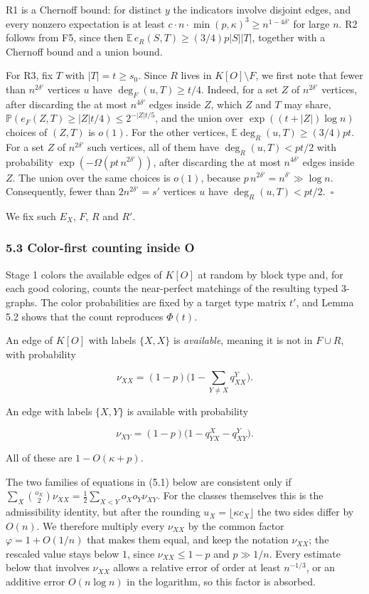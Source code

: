\documentclass[english,11pt,a4paper]{article}
\begin{document}
R1 is a Chernoff bound: for distinct \(y\) the indicators involve disjoint edges, and every nonzero expectation is at least \(c\cdot n\cdot\min(p,\kappa)^3\ge n^{1-4\delta'}\) for large \(n\). R2 follows from F5, since then \(\mathbb E\,e_R(S,T)\ge(3/4)p|S||T|\), together with a Chernoff bound and a union bound.

For R3, fix \(T\) with \(|T|=t\ge s_0\). Since \(R\) lives in \(K[O]\setminus F\), we first note that fewer than \(n^{2\delta'}\) vertices \(u\) have \(\deg_F(u,T)\ge t/4\). Indeed, for a set \(Z\) of \(n^{2\delta'}\) vertices, after discarding the at most \(n^{4\delta'}\) edges inside \(Z\), which \(Z\) and \(T\) may share, \(\mathbb P(e_F(Z,T)\ge|Z|t/4)\le2^{-|Z|t/5}\), and the union over \(\exp((t+|Z|)\log n)\) choices of \((Z,T)\) is \(o(1)\). For the other vertices, \(\mathbb E\deg_R(u,T)\ge(3/4)pt\). For a set \(Z\) of \(n^{2\delta'}\) such vertices, all of them have \(\deg_R(u,T)<pt/2\) with probability \(\exp(-\Omega(pt\,n^{2\delta'}))\), after discarding the at most \(n^{4\delta'}\) edges inside \(Z\). The union over the same choices is \(o(1)\), because \(p\,n^{2\delta'}=n^{\delta'}\gg\log n\). Consequently, fewer than \(2n^{2\delta'}=s'\) vertices \(u\) have \(\deg_R(u,T)<pt/2\).~\(\square\)

We fix such \(E_X\), \(F\), \(R\) and \(R'\).

\subsubsection{5.3 Color-first counting inside O}\label{color-first-counting-inside-o}

Stage 1 colors the available edges of \(K[O]\) at random by block type and, for each good coloring, counts the near-perfect matchings of the resulting typed 3-graphs. The color probabilities are fixed by a target type matrix \(t'\), and Lemma 5.2 shows that the count reproduces \(\Phi(t)\).

An edge of \(K[O]\) with labels \(\{X,X\}\) is \emph{available}, meaning it is not in \(F\cup R\), with probability

\nopagebreak[4]
\[\nu_{XX}=(1-p)\Big(1-\sum_{Y\ne X}q^Y_{XX}\Big).\]

An edge with labels \(\{X,Y\}\) is available with probability

\nopagebreak[4]
\[\nu_{XY}=(1-p)\big(1-q^X_{YX}-q^Y_{XY}\big).\]

All of these are \(1-O(\kappa+p)\).

The two families of equations in (5.1) below are consistent only if \(\sum_X\binom{o_X}{2}\nu_{XX}=\frac12\sum_{X<Y}o_Xo_Y\nu_{XY}\). For the classes themselves this is the admissibility identity, but after the rounding \(u_X=\lfloor\kappa c_X\rfloor\) the two sides differ by \(O(n)\). We therefore multiply every \(\nu_{XX}\) by the common factor \(\varphi=1+O(1/n)\) that makes them equal, and keep the notation \(\nu_{XX}\); the rescaled value stays below \(1\), since \(\nu_{XX}\le1-p\) and \(p\gg1/n\). Every estimate below that involves \(\nu_{XX}\) allows a relative error of order at least \(n^{-1/3}\), or an additive error \(O(n\log n)\) in the logarithm, so this factor is absorbed.
\end{document}
